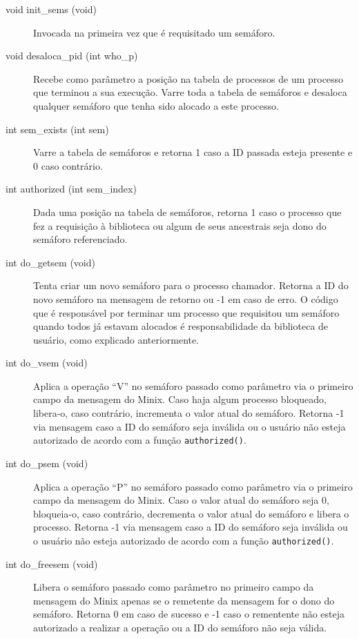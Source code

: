 \documentclass[brazil, a4paper]{scrartcl}
\begin{document}
\begin{description}
	\item[void init\_sems (void)] Invocada na primeira vez que é requisitado um
		semáforo.
	\item[void desaloca\_pid (int who\_p)] Recebe como parâmetro a posição na tabela
		de processos de um processo	que terminou a sua execução. Varre toda a
		tabela de semáforos e desaloca qualquer semáforo que tenha sido alocado
		a este processo.
	\item[int sem\_exists (int sem)] Varre a tabela de semáforos e retorna 1 caso
		a ID passada esteja presente e 0 caso contrário.
	\item[int authorized (int sem\_index)] Dada uma posição na tabela de semáforos,
		retorna 1 caso o processo que fez a requisição à biblioteca ou algum de
		seus ancestrais seja dono do semáforo referenciado.
	\item[int do\_getsem (void)] Tenta criar um novo semáforo para o processo
		chamador. Retorna a ID do novo semáforo na mensagem de retorno ou -1
		em caso de erro. O código que é responsável por terminar um processo
		que requisitou um semáforo quando todos já estavam alocados é
		responsabilidade da biblioteca de usuário, como explicado anteriormente.
	\item[int do\_vsem (void)] Aplica a operação ``V'' no semáforo passado como
		parâmetro via o primeiro campo da mensagem do Minix. Caso haja algum
		processo bloqueado, libera-o, caso contrário, incrementa o valor atual
		do semáforo. Retorna -1 via mensagem caso a ID do semáforo seja inválida ou o usuário
		não esteja autorizado de acordo com a função \texttt{authorized()}.
	\item[int do\_psem (void)] Aplica a operação ``P'' no semáforo passado como
		parâmetro via o primeiro campo da mensagem do Minix. Caso o valor atual
		do semáforo seja 0, bloqueia-o, caso contrário, decrementa o valor atual
		do semáforo e libera o processo. Retorna -1 via mensagem caso a ID do semáforo seja
		inválida ou o usuário não esteja autorizado de acordo com a função \texttt{authorized()}.
	\item[int do\_freesem (void)] Libera o semáforo passado como parâmetro no
		primeiro campo da mensagem do Minix apenas se o remetente da
		mensagem for o dono do semáforo. Retorna 0 em caso de sucesso e -1
		caso o rementente não esteja autorizado a realizar a operação ou a ID do
		semáforo não seja válida.
\end{description}
\end{document}
